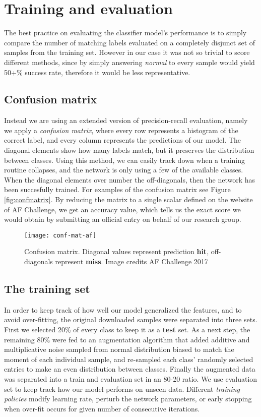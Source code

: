 \chapter{Training and evaluation}

The best practice on evaluating the classifier model's performance is to simply compare the number of matching labels evaluated on a completely disjunct set of samples from the training set.
However in our case it was not so trivial to score different methods, since by simply answering \textit{normal} to every sample would yield 50+\% success rate, therefore it would be less representative.

\section{Confusion matrix}
Instead we are using an extended version of precision-recall evaluation, namely we apply a \textit{confusion matrix}, where every row represents a histogram of the correct label, and every column represents the predictions of our model. The diagonal elements show how many labels match, but it preserves the distribution between classes.
Using this method, we can easily track down when a training routine collapses, and the network is only using a few of the available classes. When the diagonal elements over number the off-diagonals, then the network has been succesfully trained. For examples of the confusion matrix see Figure \ref{fig:confmatrix}.
By reducing the matrix to a single scalar defined on the website of AF Challenge, we get an accuracy value, which tells us the exact score we would obtain by submitting an official entry on behalf of our research group.

\begin{figure}
  \centering
  \texttt{[image: conf-mat-af]}\label{fig:FCN}
  \caption{Confusion matrix. Diagonal values represent prediction \textbf{hit}, off-diagonals represent \textbf{miss}. Image credits AF Challenge 2017}
\end{figure}

\section{The training set}
In order to keep track of how well our model generalized the features, and to avoid over-fitting, the original downloaded samples were separated into three sets.
First we selected 20\% of every class to keep it as a \textbf{test} set.
As a next step, the remaining 80\% were fed to an augmentation algorithm that added additive and multiplicative noise sampled from normal distribution biased to match the moment of each individual sample, and re-sampled each class' randomly selected entries to make an even distribution between classes.
Finally the augmented data was separated into a train and evaluation set in an 80-20 ratio.
We use evaluation set to keep track how our model performs on unseen data.
Different \textit{training policies} modify learning rate, perturb the network parameters, or early stopping when over-fit occurs for given number of consecutive iterations.

